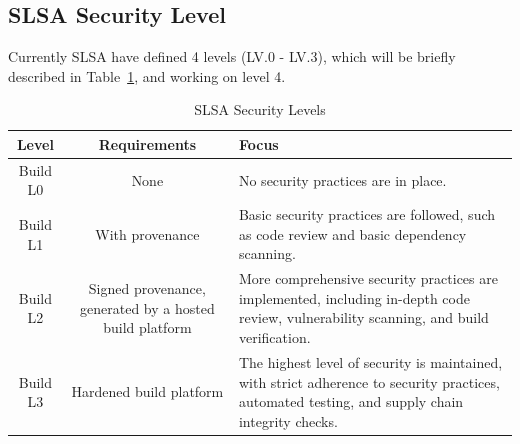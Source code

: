 \subsection{SLSA Security Level}
Currently SLSA have defined 4 levels (LV.0 - LV.3), which will be 
briefly described in Table~\ref{tab:slsa-levels}, and working on level 4.
\begin{table}[ht]
  \centering
  \caption{SLSA Security Levels}
  \label{tab:slsa-levels}
  \begin{tabular}{|c|c|p{6cm}|}
  \hline
  \textbf{Level} & \textbf{Requirements} & \textbf{Focus} \\
  \hline
  Build L0 & None & No security practices are in place. \\
  \hline
  Build L1 & With provenance & Basic security practices are followed, such as code review and basic dependency scanning. \\
  \hline
  Build L2 & Signed provenance, generated by a hosted build platform & More comprehensive security practices are implemented, including in-depth code review, vulnerability scanning, and build verification. \\
  \hline
  Build L3 & Hardened build platform & The highest level of security is maintained, with strict adherence to security practices, automated testing, and supply chain integrity checks. \\
  \hline
  \end{tabular}
\end{table}


